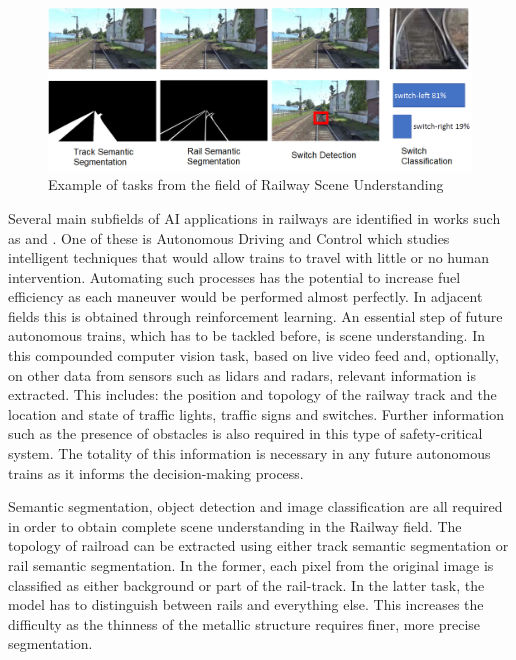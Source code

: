 \documentclass[conference]{IEEEtran}
\begin{document}
\begin{figure}[htb]
    \centering
	\centerline{\includegraphics[scale=0.65]{figures/rail_tasks.png}}
	\caption{Example of tasks from the field of Railway Scene Understanding}
	\label{fig:railtasks}
\end{figure}

Several main subfields of AI applications in railways are identified in works such as \cite{bevsinovic2021artificial} and \cite{tang2022literature}. One of these is Autonomous Driving and Control which studies 
intelligent techniques that would allow trains to travel with little or no human intervention. Automating 
such processes has the potential to increase fuel efficiency as each maneuver would be performed almost perfectly. In adjacent fields this is obtained through reinforcement learning. An essential step of future autonomous trains, which has to be tackled before, is scene understanding. In this compounded computer vision task, based on live video feed and, optionally, on other data from sensors such as lidars and radars, relevant information is extracted. This includes: the position and  topology of the railway track and the location and state of traffic lights, traffic signs and switches. Further information such as the presence of obstacles is also required in this type of safety-critical system. The totality of this information is necessary in any future autonomous trains as it informs the decision-making process.

Semantic segmentation, object detection and image classification are all required in order to obtain complete scene understanding in the Railway field. The topology of railroad can be extracted using either track semantic segmentation or rail semantic segmentation. In the former, each pixel from the original image is classified as either background or part of the rail-track. In the latter task,  the model has to distinguish between rails and everything else. This increases the difficulty as the thinness of the metallic structure requires finer, more precise segmentation.
\end{document}
